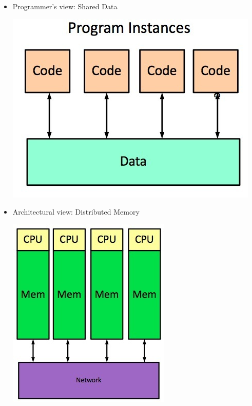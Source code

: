 \documentclass[a4paper]{article}
\begin{document}
\begin{itemize}
\item Programmer's view: Shared Data
\begin{center}
\includegraphics[scale=0.4]{Figures/programmersViewSharedData.jpg}
\end{center}

\item Architectural view: Distributed Memory
\begin{center}
\includegraphics[scale=0.4]{Figures/architecturalViewDistributedMemory.jpg}
\end{center}


\end{itemize}
\end{document}
